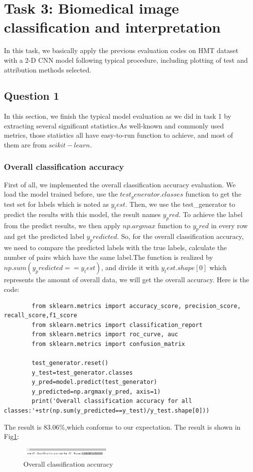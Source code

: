 \documentclass[conference]{IEEEtran}
\begin{document}
	\section{Task 3: Biomedical image classification and interpretation}
    In this task, we basically apply the previous evaluation codes on HMT dataset with a 2-D CNN model following typical procedure, including plotting of test and attribution methods selected.
	\subsection{Question 1}
    In this section, we finish the typical model evaluation as we did in task 1 by extracting several significant statistics.As well-known and commonly used metrics, those statistics all have easy-to-run
    function to achieve, and most of them are from $scikit-learn$.
	\subsubsection{Overall classification accuracy}
    First of all, we implemented the overall classification accuracy evaluation. We load the model trained before, use the $test_generator.classes$ function to get the test set for labels which is noted as $y_test$.
    Then, we use the test_generator to predict the results with this model, the result names $y_pred$. To achieve the label from the predict results, we then apply $np.argmax$ function to $y_pred$ in every row and get the predicted label $y_predicted$. 
    So, for the overall classification accuracy, we need to compare the predicted labels with the true labels, calculate the number of pairs which have the same label.The function is realized by $np.sum(y_predicted==y_test)$, and divide it with $y_test.shape[0]$ which represents the amount of overall data, we will get the overall accuracy.
	Here is the code:
	\begin{lstlisting}
		from sklearn.metrics import accuracy_score, precision_score, recall_score,f1_score
		from sklearn.metrics import classification_report
		from sklearn.metrics import roc_curve, auc
		from sklearn.metrics import confusion_matrix
		
		test_generator.reset()
		y_test=test_generator.classes
		y_pred=model.predict(test_generator)
		y_predicted=np.argmax(y_pred, axis=1)
		print('Overall classification accuracy for all classes:'+str(np.sum(y_predicted==y_test)/y_test.shape[0]))
	\end{lstlisting}
	The result is 83.06\%,which conforms to our expectation. The result is shown in Fig\ref{Fig.t3q1}:
	\begin{figure}[h] 
		\centering
		\includegraphics[width=0.4\textwidth]{T3Q1a.png}
		\caption{Overall classification accuracy}
		\label{Fig.t3q1}
	\end{figure}
\end{document}
